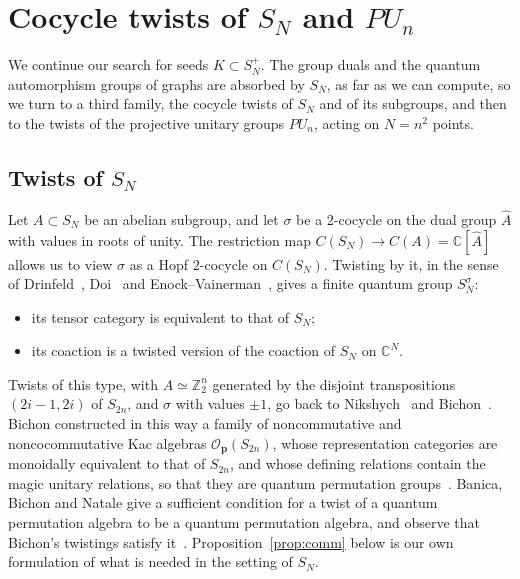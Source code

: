 \documentclass[11pt]{amsart}
\theoremstyle{definition}
\theoremstyle{remark}
\theoremstyle{plain}
\numberwithin{equation}{section}
\numberwithin{table}{section}
\newcommand{\C}{\mathbb C}
\newcommand{\Z}{\mathbb Z}
\begin{document}

\section{Cocycle twists of \texorpdfstring{$S_N$}{SN} and \texorpdfstring{$PU_n$}{PUn}}\label{sec:twists}

We continue our search for seeds $K\subset S_N^+$. The group duals and the quantum automorphism groups of graphs are absorbed by $S_N$, as far as we can compute, so we turn to a third family, the cocycle twists of $S_N$ and of its subgroups, and then to the twists of the projective unitary groups $PU_n$, acting on $N=n^2$ points.

\subsection{Twists of $S_N$}\label{sec:twsn}

Let $A\subset S_N$ be an abelian subgroup, and let $\sigma$ be a $2$-cocycle on the dual group $\widehat A$ with values in roots of unity. The restriction map $C(S_N)\to C(A)=\C[\widehat A]$ allows us to view $\sigma$ as a Hopf $2$-cocycle on $C(S_N)$. Twisting by it, in the sense of Drinfeld~\cite{dr}, Doi~\cite{doi} and Enock--Vainerman~\cite{ev,va}, gives a finite quantum group $S_N^\sigma$:
\begin{itemize}
\item its tensor category is equivalent to that of $S_N$;
\item its coaction is a twisted version of the coaction of $S_N$ on $\C^N$.
\end{itemize}
Twists of this type, with $A\simeq\Z_2^n$ generated by the disjoint transpositions $(2i-1,2i)$ of $S_{2n}$, and $\sigma$ with values $\pm1$, go back to Nikshych~\cite{ni} and Bichon~\cite{bi00}. Bichon constructed in this way a family of noncommutative and noncocommutative Kac algebras $\mathcal O_{\mathbf p}(S_{2n})$, whose representation categories are monoidally equivalent to that of $S_{2n}$, and whose defining relations contain the magic unitary relations, so that they are quantum permutation groups~\cite[Def.~1, Thm.~2]{bi00}. Banica, Bichon and Natale give a sufficient condition for a twist of a quantum permutation algebra to be a quantum permutation algebra, and observe that Bichon's twistings satisfy it~\cite[Prop.~8.1, Ex.~8.2]{bbn}. Proposition~\ref{prop:comm} below is our own formulation of what is needed in the setting of $S_N$.
\end{document}
